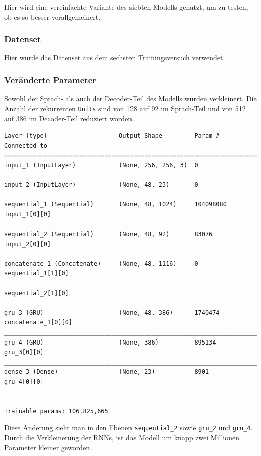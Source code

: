 \documentclass[pdftex,a4paper,halfparskip, article]{scrartcl}
\begin{document}
Hier wird eine vereinfachte Variante des siebten Modells genutzt, um zu testen, ob es so besser verallgemeinert.

\subsubsection*{Datenset}

Hier wurde das Datenset aus dem sechsten Trainingsversuch verwendet.

\subsubsection*{Veränderte Parameter}

Sowohl der Sprach- als auch der Decoder-Teil des Modells wurden verkleinert. Die Anzahl der rekurrenten \texttt{Units} sind von 128 auf 92 im Sprach-Teil und von 512 auf 386 im Decoder-Teil reduziert worden.

\begin{verbatim}
Layer (type)                    Output Shape         Param #     Connected to
=============================================================================
input_1 (InputLayer)            (None, 256, 256, 3)  0
_____________________________________________________________________________
input_2 (InputLayer)            (None, 48, 23)       0
_____________________________________________________________________________
sequential_1 (Sequential)       (None, 48, 1024)     104098080   input_1[0][0]
_____________________________________________________________________________
sequential_2 (Sequential)       (None, 48, 92)       83076       input_2[0][0]
_____________________________________________________________________________
concatenate_1 (Concatenate)     (None, 48, 1116)     0           sequential_1[1][0]
                                                                 sequential_2[1][0]
_____________________________________________________________________________
gru_3 (GRU)                     (None, 48, 386)      1740474     concatenate_1[0][0]
_____________________________________________________________________________
gru_4 (GRU)                     (None, 386)          895134      gru_3[0][0]
_____________________________________________________________________________
dense_3 (Dense)                 (None, 23)           8901        gru_4[0][0]


Trainable params: 106,825,665
\end{verbatim}

Diese Änderung sieht man in den Ebenen \texttt{sequential\_2} sowie \texttt{gru\_2} und \texttt{gru\_4}.
Durch die Verkleinerung der RNNs, ist das Modell um knapp zwei Millionen Parameter kleiner geworden.
\end{document}
